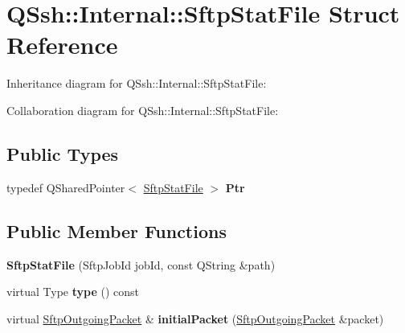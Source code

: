 \hypertarget{struct_q_ssh_1_1_internal_1_1_sftp_stat_file}{}\section{Q\+Ssh\+:\+:Internal\+:\+:Sftp\+Stat\+File Struct Reference}
\label{struct_q_ssh_1_1_internal_1_1_sftp_stat_file}


Inheritance diagram for Q\+Ssh\+:\+:Internal\+:\+:Sftp\+Stat\+File\+:


Collaboration diagram for Q\+Ssh\+:\+:Internal\+:\+:Sftp\+Stat\+File\+:
\subsection*{Public Types}
\begin{DoxyCompactItemize}
\item 
\mbox{\label{struct_q_ssh_1_1_internal_1_1_sftp_stat_file_a57184d4a91ed67cf512bc668e5b644c0}} 
typedef Q\+Shared\+Pointer$<$ \mbox{\hyperlink{struct_q_ssh_1_1_internal_1_1_sftp_stat_file}{Sftp\+Stat\+File}} $>$ {\bfseries Ptr}
\end{DoxyCompactItemize}
\subsection*{Public Member Functions}
\begin{DoxyCompactItemize}
\item 
\mbox{\label{struct_q_ssh_1_1_internal_1_1_sftp_stat_file_ac1192c4539545fa2167cc7cd9db8f644}} 
{\bfseries Sftp\+Stat\+File} (Sftp\+Job\+Id job\+Id, const Q\+String \&path)
\item 
\mbox{\label{struct_q_ssh_1_1_internal_1_1_sftp_stat_file_ae25747b9fd379af7856e11b526ba6b60}} 
virtual Type {\bfseries type} () const
\item 
\mbox{\label{struct_q_ssh_1_1_internal_1_1_sftp_stat_file_a55368e79f73fa82fe6011427b3ed51ba}} 
virtual \mbox{\hyperlink{class_q_ssh_1_1_internal_1_1_sftp_outgoing_packet}{Sftp\+Outgoing\+Packet}} \& {\bfseries initial\+Packet} (\mbox{\hyperlink{class_q_ssh_1_1_internal_1_1_sftp_outgoing_packet}{Sftp\+Outgoing\+Packet}} \&packet)
\end{DoxyCompactItemize}
